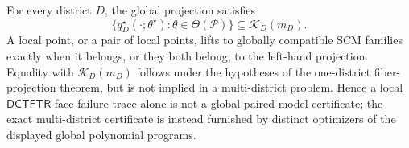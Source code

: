 For every district \(D\), the global projection satisfies
\[
 \{q_D^\star(\cdot;\theta^\star):\theta\in\Theta(\mathcal P)\}
 \subseteq \mathcal K_D(m_D).
\]
A local point, or a pair of local points, lifts to globally compatible SCM families exactly when it belongs, or they both belong, to the left-hand projection.  Equality with \(\mathcal K_D(m_D)\) follows under the hypotheses of the one-district fiber-projection theorem, but is not implied in a multi-district problem.  Hence a local \(\mathsf{DCTFTR}\) face-failure trace alone is not a global paired-model certificate; the exact multi-district certificate is instead furnished by distinct optimizers of the displayed global polynomial programs.